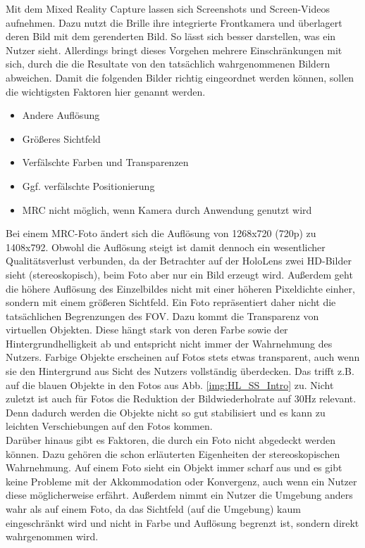 Mit dem Mixed Reality Capture lassen sich Screenshots und Screen-Videos aufnehmen. Dazu nutzt die Brille ihre integrierte Frontkamera und überlagert deren Bild mit dem gerenderten Bild. So lässt sich besser darstellen, was ein Nutzer sieht. Allerdings bringt dieses Vorgehen mehrere Einschränkungen mit sich, durch die die Resultate von den tatsächlich wahrgenommenen Bildern abweichen. Damit die folgenden Bilder richtig eingeordnet werden können, sollen die wichtigsten Faktoren hier genannt werden.

\begin{itemize}
	\setlength{\itemsep}{-1pt}
	\singlespacing
	\item Andere Auflösung
	\item Größeres Sichtfeld
	\item Verfälschte Farben und Transparenzen
	\item Ggf. verfälschte Positionierung
	\item MRC nicht möglich, wenn Kamera durch Anwendung genutzt wird
\end{itemize}

Bei einem MRC-Foto ändert sich die Auflösung von 1268x720 (720p) zu 1408x792. Obwohl die Auflösung steigt ist damit dennoch ein wesentlicher Qualitätsverlust verbunden, da der Betrachter auf der HoloLens zwei HD-Bilder sieht (stereoskopisch), beim Foto aber nur ein Bild erzeugt wird. Außerdem geht die höhere Auflösung des Einzelbildes nicht mit einer höheren Pixeldichte einher, sondern mit einem größeren Sichtfeld. Ein Foto repräsentiert daher nicht die tatsächlichen Begrenzungen des FOV. Dazu kommt die Transparenz von virtuellen Objekten. Diese hängt stark von deren Farbe sowie der Hintergrundhelligkeit ab und entspricht nicht immer der Wahrnehmung des Nutzers. Farbige Objekte erscheinen auf Fotos stets etwas transparent, auch wenn sie den Hintergrund aus Sicht des Nutzers vollständig überdecken. Das trifft z.B. auf die blauen Objekte in den Fotos aus Abb. \ref{img:HL_SS_Intro} zu. Nicht zuletzt ist auch für Fotos die Reduktion der Bildwiederholrate auf 30Hz relevant. Denn dadurch werden die Objekte nicht so gut stabilisiert und es kann zu leichten Verschiebungen auf den Fotos kommen.\\

Darüber hinaus gibt es Faktoren, die durch ein Foto nicht abgedeckt werden können. Dazu gehören die schon erläuterten Eigenheiten der stereoskopischen Wahrnehmung. Auf einem Foto sieht ein Objekt immer scharf aus und es gibt keine Probleme mit der Akkommodation oder Konvergenz, auch wenn ein Nutzer diese möglicherweise erfährt. Außerdem nimmt ein Nutzer die Umgebung anders wahr als auf einem Foto, da das Sichtfeld (auf die Umgebung) kaum eingeschränkt wird und nicht in Farbe und Auflösung begrenzt ist, sondern direkt wahrgenommen wird.\\

